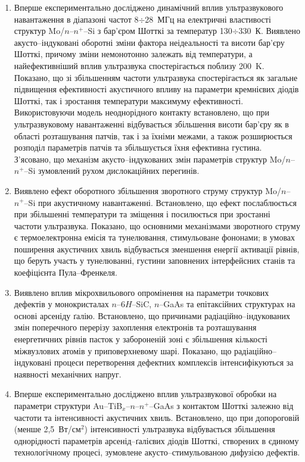 \begin{enumerate}[leftmargin=0cm,itemindent=3em]
\item
Вперше експериментально досліджено динамічний вплив ультразвукового навантаження в діапазоні частот 8$\div$28~МГц на електричні властивості структур Mo/$n$--$n^{+}$--Si з бар'єром Шотткі за температур 130$\div$330~К.
 Виявлено акусто--індуковані оборотні зміни фактора неідеальності та висоти бар'єру Шотткі, причому зміни немонотонно залежать від температури, а найефективніший вплив ультразвука спостерігається поблизу 200~K.
  Показано, що зі збільшенням частоти ультразвука  спостерігається як загальне підвищення ефективності акустичного впливу на параметри кремнієвих діодів Шотткі,
так і зростання температури максимуму ефективності.
 Використовуючи модель неоднорідного контакту встановлено, що при ультразвуковому навантаженні відбувається збільшення висоти бар'єру як в області розташування патчів, так і за їхніми межами, а також розширюється розподіл параметрів патчів та збільшується їхня ефективна густина.
З'ясовано, що механізм акусто--індукованих змін параметрів структур Mo/$n$--$n^{+}$--Si зумовлений рухом дислокаційних перегинів.

\item Виявлено ефект оборотного збільшення зворотного струму структур Mo/$n$--$n^{+}$--Si при акустичному навантаженні.
Встановлено, що ефект послаблюється при збільшенні температури та зміщення і посилюється при зростанні частоти ультразвука.
Показано, що основними механізмами зворотного струму є термоелектронна емісія та тунелювання, стимульоване фононами;
в умовах поширення акустичних хвиль відбувається зменшення енергії активації рівнів, що беруть участь у тунелюванні,
густини заповнених інтерфейсних станів та коефіцієнта Пула--Френкеля.

\item Виявлено вплив мікрохвильового опромінення на параметри точкових дефектів у монокристалах $n$--6$H$--SiC, $n$--GaAs та епітаксійних структурах на основі арсеніду ґалію.
Встановлено, що причинами радіаційно--індукованих змін поперечного перерізу захоплення електронів та розташування енергетичних рівнів пасток у забороненій зоні є
збільшення кількості міжвузлових атомів у приповерхневому шарі.
Показано, що радіаційно--індуковані процеси перетворення дефектних комплексів інтенсифікуються за наявності механічних напруг.

\item Вперше експериментально досліджено вплив ультразвукової обробки на параметри структури Au--TiB$_x$--$n$--$n^+$--GaAs з контактом Шотткі
 залежно від частоти та інтенсивності акустичних хвиль.
 Встановлено, що при допороговій (менше 2,5~Вт/см$^2$) інтенсивності ультразвука відбувається збільшення однорідності параметрів арсенід--ґалієвих діодів Шотткі, створених в єдиному технологічному процесі, зумовлене
 акусто--стимульованою дифузією  дефектів.




\end{enumerate}
